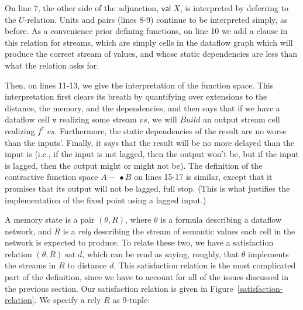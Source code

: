 \documentclass[nocopyrightspace,preprint]{sigplanconf}
\newcommand{\term}[1]{\ensuremath{\mathtt{{#1}}}}
\newcommand{\Build}{\mathit{Build}}
\newcommand{\lollishrink}{-\!\!\!\,\bullet}
\newcommand{\valtype}[1]{\mathsf{val}\;{#1}}
\newcommand{\satisfy}[2]{{#1}\;\mathrm{sat}\;{#2}}
\begin{document}
On line 7, the other side of the adjunction, $\valtype{X}$, is
interpreted by deferring to the $U$-relation.  Units and pairs (lines
8-9) continue to be interpreted simply, as before.  As a convenience
prior defining functions, on line 10 we add a clause in this relation
for streams, which are simply cells in the dataflow graph which will
produce the correct stream of values, and whose static dependencies
are less than what the relation asks for.

Then, on lines 11-13, we give the interpretation of the function
space.  This interpretation first clears its breath by quantifying
over extensions to the distance, the memory, and the dependencies, and
then says that if we have a dataflow cell \term{v} realizing some
stream $vs$, we will $\Build$ an output stream cell realizing
$f^\dagger\;vs$. Furthermore, the static dependencies of the result
are no worse than the inputs'. Finally, it says that the result will
be no more delayed than the input is (i.e., if the input is not
lagged, then the output won't be, but if the input is lagged, then the
output might or might not be). The definition of the contractive
function space $A \lollishrink B$ on lines 15-17 is similar, except that it
promises that its output will not be lagged, full stop. (This is what
justifies the implementation of the fixed point using a lagged input.)

A memory state is a pair $(\theta, R)$, where $\theta$ is a formula
describing a dataflow network, and $R$ is a \emph{rely} describing the
stream of semantic values each cell in the network is expected to
produce. To relate these two, we have a satisfaction relation
$\satisfy{(\theta, R)}{d}$, which can be read as saying, roughly, that
$\theta$ implements the streams in $R$ to distance $d$. This
satisfaction relation is the most complicated part of the definition,
since we have to account for all of the issues discussed in the
previous section. Our satisfaction relation is given in
Figure~\ref{satisfaction-relation}.
We specify a rely $R$ as 9-tuple:
\end{document}
